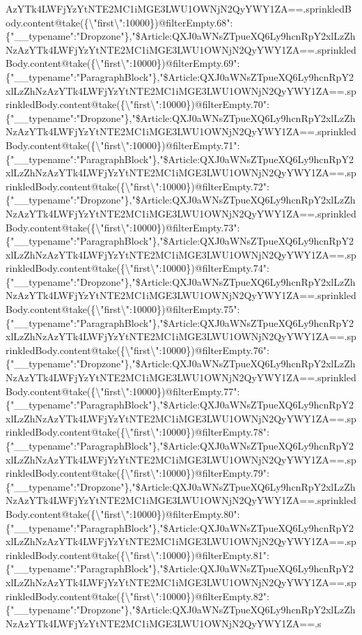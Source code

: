 AzYTk4LWFjYzYtNTE2MC1iMGE3LWU1OWNjN2QyYWY1ZA==.sprinkledBody.content@take(\{\textbackslash{}"first\textbackslash{}":10000\})@filterEmpty.68":\{"\_\_typename":"Dropzone"\},"\$Article:QXJ0aWNsZTpueXQ6Ly9hcnRpY2xlLzZhNzAzYTk4LWFjYzYtNTE2MC1iMGE3LWU1OWNjN2QyYWY1ZA==.sprinkledBody.content@take(\{\textbackslash{}"first\textbackslash{}":10000\})@filterEmpty.69":\{"\_\_typename":"ParagraphBlock"\},"\$Article:QXJ0aWNsZTpueXQ6Ly9hcnRpY2xlLzZhNzAzYTk4LWFjYzYtNTE2MC1iMGE3LWU1OWNjN2QyYWY1ZA==.sprinkledBody.content@take(\{\textbackslash{}"first\textbackslash{}":10000\})@filterEmpty.70":\{"\_\_typename":"Dropzone"\},"\$Article:QXJ0aWNsZTpueXQ6Ly9hcnRpY2xlLzZhNzAzYTk4LWFjYzYtNTE2MC1iMGE3LWU1OWNjN2QyYWY1ZA==.sprinkledBody.content@take(\{\textbackslash{}"first\textbackslash{}":10000\})@filterEmpty.71":\{"\_\_typename":"ParagraphBlock"\},"\$Article:QXJ0aWNsZTpueXQ6Ly9hcnRpY2xlLzZhNzAzYTk4LWFjYzYtNTE2MC1iMGE3LWU1OWNjN2QyYWY1ZA==.sprinkledBody.content@take(\{\textbackslash{}"first\textbackslash{}":10000\})@filterEmpty.72":\{"\_\_typename":"Dropzone"\},"\$Article:QXJ0aWNsZTpueXQ6Ly9hcnRpY2xlLzZhNzAzYTk4LWFjYzYtNTE2MC1iMGE3LWU1OWNjN2QyYWY1ZA==.sprinkledBody.content@take(\{\textbackslash{}"first\textbackslash{}":10000\})@filterEmpty.73":\{"\_\_typename":"ParagraphBlock"\},"\$Article:QXJ0aWNsZTpueXQ6Ly9hcnRpY2xlLzZhNzAzYTk4LWFjYzYtNTE2MC1iMGE3LWU1OWNjN2QyYWY1ZA==.sprinkledBody.content@take(\{\textbackslash{}"first\textbackslash{}":10000\})@filterEmpty.74":\{"\_\_typename":"Dropzone"\},"\$Article:QXJ0aWNsZTpueXQ6Ly9hcnRpY2xlLzZhNzAzYTk4LWFjYzYtNTE2MC1iMGE3LWU1OWNjN2QyYWY1ZA==.sprinkledBody.content@take(\{\textbackslash{}"first\textbackslash{}":10000\})@filterEmpty.75":\{"\_\_typename":"ParagraphBlock"\},"\$Article:QXJ0aWNsZTpueXQ6Ly9hcnRpY2xlLzZhNzAzYTk4LWFjYzYtNTE2MC1iMGE3LWU1OWNjN2QyYWY1ZA==.sprinkledBody.content@take(\{\textbackslash{}"first\textbackslash{}":10000\})@filterEmpty.76":\{"\_\_typename":"Dropzone"\},"\$Article:QXJ0aWNsZTpueXQ6Ly9hcnRpY2xlLzZhNzAzYTk4LWFjYzYtNTE2MC1iMGE3LWU1OWNjN2QyYWY1ZA==.sprinkledBody.content@take(\{\textbackslash{}"first\textbackslash{}":10000\})@filterEmpty.77":\{"\_\_typename":"ParagraphBlock"\},"\$Article:QXJ0aWNsZTpueXQ6Ly9hcnRpY2xlLzZhNzAzYTk4LWFjYzYtNTE2MC1iMGE3LWU1OWNjN2QyYWY1ZA==.sprinkledBody.content@take(\{\textbackslash{}"first\textbackslash{}":10000\})@filterEmpty.78":\{"\_\_typename":"ParagraphBlock"\},"\$Article:QXJ0aWNsZTpueXQ6Ly9hcnRpY2xlLzZhNzAzYTk4LWFjYzYtNTE2MC1iMGE3LWU1OWNjN2QyYWY1ZA==.sprinkledBody.content@take(\{\textbackslash{}"first\textbackslash{}":10000\})@filterEmpty.79":\{"\_\_typename":"Dropzone"\},"\$Article:QXJ0aWNsZTpueXQ6Ly9hcnRpY2xlLzZhNzAzYTk4LWFjYzYtNTE2MC1iMGE3LWU1OWNjN2QyYWY1ZA==.sprinkledBody.content@take(\{\textbackslash{}"first\textbackslash{}":10000\})@filterEmpty.80":\{"\_\_typename":"ParagraphBlock"\},"\$Article:QXJ0aWNsZTpueXQ6Ly9hcnRpY2xlLzZhNzAzYTk4LWFjYzYtNTE2MC1iMGE3LWU1OWNjN2QyYWY1ZA==.sprinkledBody.content@take(\{\textbackslash{}"first\textbackslash{}":10000\})@filterEmpty.81":\{"\_\_typename":"ParagraphBlock"\},"\$Article:QXJ0aWNsZTpueXQ6Ly9hcnRpY2xlLzZhNzAzYTk4LWFjYzYtNTE2MC1iMGE3LWU1OWNjN2QyYWY1ZA==.sprinkledBody.content@take(\{\textbackslash{}"first\textbackslash{}":10000\})@filterEmpty.82":\{"\_\_typename":"Dropzone"\},"\$Article:QXJ0aWNsZTpueXQ6Ly9hcnRpY2xlLzZhNzAzYTk4LWFjYzYtNTE2MC1iMGE3LWU1OWNjN2QyYWY1ZA==.s